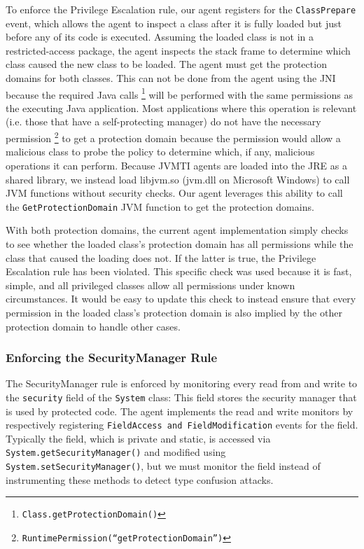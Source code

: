 \documentclass{sig-alternate}
\begin{document}
To enforce the Privilege Escalation rule, our agent registers for
the \texttt{ClassPrepare} event, which allows the agent to inspect
a class after it is fully loaded but just before any of its code is
executed. Assuming the loaded class is not in a restricted-access
package, the agent inspects the stack frame to determine which class
caused the new class to be loaded. The agent must get the protection
domains for both classes. This can not be done from the agent using
the JNI because the required Java calls%
\footnote{\texttt{Class.getProtectionDomain()}%
} will be performed with the same permissions as the executing Java
application. Most applications where this operation is relevant (i.e.
those that have a self-protecting manager) do not have the necessary
permission%
\footnote{\texttt{RuntimePermission(``getProtectionDomain'')}%
} to get a protection domain because the permission would allow a malicious
class to probe the policy to determine which, if any, malicious operations
it can perform. Because JVMTI agents are loaded into the JRE as a
shared library, we instead load libjvm.so (jvm.dll on Microsoft Windows)
to call JVM functions without security checks. Our agent leverages
this ability to call the \texttt{GetProtectionDomain} JVM function
to get the protection domains. 

With both protection domains, the current agent implementation simply
checks to see whether the loaded class's protection domain has all
permissions while the class that caused the loading does not. If the
latter is true, the Privilege Escalation rule has been violated. This
specific check was used because it is fast, simple, and all privileged
classes allow all permissions under known circumstances. It would
be easy to update this check to instead ensure that every permission
in the loaded class's protection domain is also implied by the other
protection domain to handle other cases.


\subsubsection{Enforcing the SecurityManager Rule}\label{sub:Enforcing-the-SecurityManager}

The SecurityManager rule is enforced by monitoring every read from
and write to the \texttt{security} field of the \texttt{System} class:
This field stores the security manager that is used by protected code.
The agent implements the read and write monitors by respectively registering
\texttt{FieldAccess and FieldModification} events for the field. Typically
the field, which is private and static, is accessed via \texttt{System.getSecurityManager()}
and modified using \texttt{System.setSecurityManager()}, but we must
monitor the field instead of instrumenting these methods to detect
type confusion attacks. 
\end{document}
